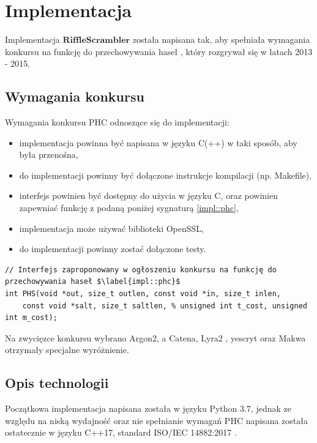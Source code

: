 \chapter{Implementacja}
\thispagestyle{chapterBeginStyle}

Implementacja $\mathbf{RiffleScrambler}$ została napisana tak, aby spełniała wymagania konkursu na funkcję do przechowywania haseł \cite[PHC, ang \textit{Password Hashing Competition}]{phc}, który rozgrywał się w latach 2013 - 2015.

\section{Wymagania konkursu}
Wymagania konkursu PHC odnoszące się do implementacji:
\begin{itemize}
	\item implementacja powinna być napisana w języku C(++) w taki sposób, aby była przenośna,
	\item do implementacji powinny być dołączone instrukcje kompilacji (np. Makefile),
	\item interfejs powinien być dostępny do użycia w języku C, oraz powinien zapewniać funkcję z podaną poniżej sygnaturą \ref{impl::phc},
	\item implementacja może używać biblioteki OpenSSL,
	\item do implementacji powinny zostać dołączone testy.
\end{itemize}

\begin{verbatim}
// Interfejs zaproponowany w ogłoszeniu konkursu na funkcję do przechowywania haseł $\label{impl::phc}$
int PHS(void *out, size_t outlen, const void *in, size_t inlen,
	const void *salt, size_t saltlen, % unsigned int t_cost, unsigned int m_cost); 
\end{verbatim}

Na zwycięzce konkursu wybrano Argon2, a Catena, Lyra2 \cite{simplicio2015lyra2}, yescryt \cite{peslyak2014yescrypt} oraz Makwa \cite{pornin2015makwa} otrzymały specjalne wyróżnienie.

\section{Opis technologii}
Początkowa implementacja napisana została w języku Python 3.7, jednak ze względu na niską wydajność oraz nie spełnianie wymagań PHC napisana została ostatecznie w języku C++17, standard ISO/IEC 14882:2017 \cite{cpp17}.

